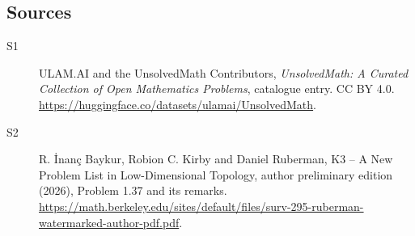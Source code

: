 \documentclass[11pt]{article}
\begin{document}
\subsection{Sources}
\begin{description}
\item[\hypertarget{source:statement:1}{S1}] ULAM.AI and the UnsolvedMath Contributors, \emph{UnsolvedMath: A Curated Collection of Open Mathematics Problems}, catalogue entry. CC BY 4.0. \url{https://huggingface.co/datasets/ulamai/UnsolvedMath}.
\item[\hypertarget{source:statement:2}{S2}] R. \.{I}nan\c{c} Baykur, Robion C. Kirby and Daniel Ruberman, K3 -- A New Problem List in Low-Dimensional Topology, author preliminary edition (2026), Problem 1.37 and its remarks. \url{https://math.berkeley.edu/sites/default/files/surv-295-ruberman-watermarked-author-pdf.pdf}.
\end{description}
\label{end:statement}
\end{document}
